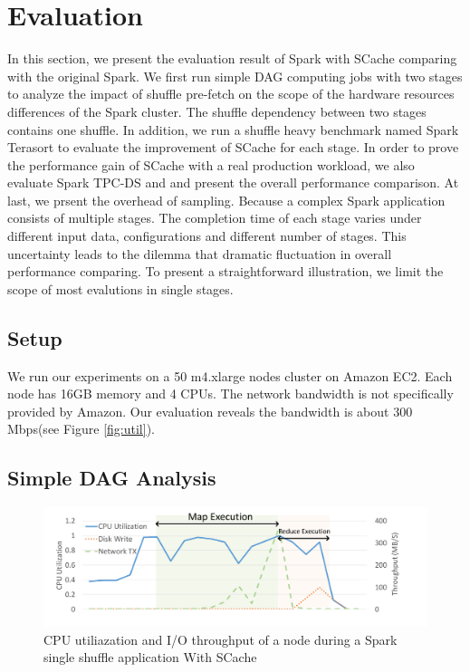 \section{Evaluation}\label{evaluation}

In this section, we present the evaluation result of Spark with SCache comparing with the original Spark. We first run simple DAG computing jobs with two stages to analyze the impact of shuffle pre-fetch on the scope of the hardware resources differences of the Spark cluster. The shuffle dependency between two stages contains one shuffle. In addition, we run a shuffle heavy benchmark named Spark Terasort\cite{spark-tera} to evaluate the improvement of SCache for each stage. In order to prove the performance gain of SCache with a real production workload, we also evaluate Spark TPC-DS\cite{sparktpcds} and and present the overall performance comparison. At last, we prsent the overhead of sampling. Because a complex Spark application consists of multiple stages. The completion time of each stage varies under different input data, configurations and different number of stages. This uncertainty leads to the dilemma that dramatic fluctuation in overall performance comparing. To present a straightforward illustration, we limit the scope of most evalutions in single stages. 

\subsection{Setup}\label{stepup}
We run our experiments on a 50 m4.xlarge nodes cluster on Amazon EC2\cite{aws}. Each node has 16GB memory and 4 CPUs. The network bandwidth is not specifically provided by Amazon. Our evaluation reveals the bandwidth is about 300 Mbps(see Figure \ref{fig:util}).

\subsection{Simple DAG Analysis}


\begin{figure}
	\includegraphics[width=\linewidth]{fig/scache_util}
	\caption{CPU utiliazation and I/O throughput of a node during a Spark single shuffle application With SCache}
	\label{fig:scache_util}
\end{figure}

